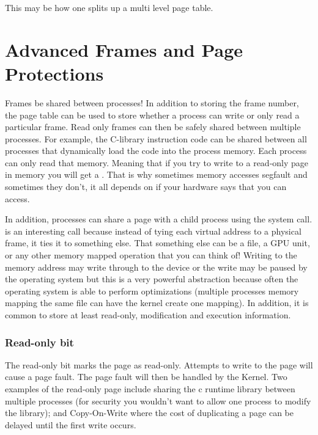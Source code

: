 \begin{enumerate}
\begin{wrapfig}
\end{wrapfig}

This may be how one splits up a multi level page table.

\section{Advanced Frames and Page Protections}\label{advanced-frames-and-page-protections}

Frames be shared between processes! In addition to storing the frame number, the page table can be used to store whether a process can write or only read a particular frame. Read only frames can then be safely shared between multiple processes. For example, the C-library instruction code can be shared between all processes that dynamically load the code into the process memory. Each process can only read that memory. Meaning that if you try to write to a read-only page in memory you will get a . That is why sometimes memory accesses segfault and sometimes they don't, it all depends on if your hardware says that you can access.

In addition, processes can share a page with a child process using the  system call.  is an interesting call because instead of tying each virtual address to a physical frame, it ties it to something else. That something else can be a file, a GPU unit, or any other memory mapped operation that you can think of! Writing to the memory address may write through to the device or the write may be paused by the operating system but this is a very powerful abstraction because often the operating system is able to perform optimizations (multiple processes memory mapping the same file can have the kernel create one mapping). In addition, it is common to store at least read-only, modification and execution information.

\subsubsection{Read-only bit}
The read-only bit marks the page as read-only. Attempts to write to the page will cause a page fault. The page fault will then be handled by the Kernel. Two examples of the read-only page include sharing the c runtime library between multiple processes (for security you wouldn't want to allow one process to modify the library); and Copy-On-Write where the cost of duplicating a page can be delayed until the first write occurs.


\end{enumerate}
